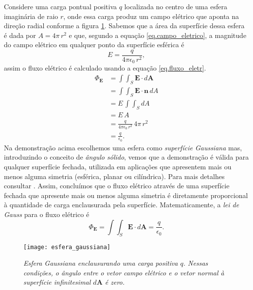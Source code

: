 Considere uma carga pontual positiva $q$ localizada no centro de uma esfera imaginária de raio $r$, onde essa carga produz um campo elétrico que aponta na direção radial conforme a figura \ref{fig.esfe_gauss}. Sabemos que a área da superfície dessa esfera é dada por $A=4\pi\,r^2$ e que, segundo a equação \ref{eq.campo_eletrico}, a magnitude do campo elétrico em qualquer ponto da superfície esférica é
\begin{equation*}
E=\frac{q}{4\pi\epsilon_0\,r^2},
\end{equation*}
assim o fluxo elétrico é calculado usando a equação \ref{eq.fluxo_eletr}.
\begin{align*}
\Phi_\textbf{E}&=\int\int_S\textbf{E}\cdot\textit{d}\textbf{A}\\
&=\int\int_S\textbf{E}\cdot\textbf{n}\,\textit{d}A\\
&=E\,\int\int_S\textit{d}A\\
&=E\,A\\
&=\frac{q}{4\pi\epsilon_0\,r^2}\,4\pi\,r^2\\
&=\frac{q}{\epsilon_0}.
\end{align*}
Na demonstração acima escolhemos uma esfera como \textit{superfície Gaussiana} mas, introduzindo o conceito de \textit{ângulo sólido}, vemos que a demonstração é válida para qualquer superfície fechada, utilizada em aplicações que apresentem mais ou menos alguma simetria (esférica, planar ou cilíndrica). Para mais detalhes consultar \cite{jackson_classical_1999}. Assim, concluímos que o fluxo elétrico através de uma superfície fechada que apresente mais ou menos alguma simetria é diretamente proporcional à quantidade de carga enclausurada pela superfície. Matematicamente, a \textit{lei de Gauss} para o fluxo elétrico é
\begin{equation}\label{eq.fluxo_eletrico}
\Phi_\textbf{E}=\int\int_S\textbf{E}\cdot\textit{d}\textbf{A}=\frac{q}{\epsilon_0}.
\end{equation}
\begin{figure}[!htb]
\centering
\texttt{[image: esfera\_gaussiana]}
\caption{\textit{Esfera Gaussiana enclausurando uma carga positiva $q$. Nessas condições, o ângulo entre o vetor campo elétrico e o vetor normal à superfície infinitesimal $d\textbf{A}$ é zero.}}
\label{fig.esfe_gauss}
\end{figure}

